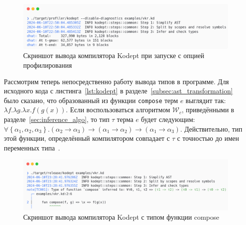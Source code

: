 \begin{figure}[h]
    \centering
    \includegraphics[width=\textwidth]{figures/profiling}
    \caption{Скриншот вывода компилятора Kodept при запуске с опцией профилирования}
    \label{fig:profiling}
\end{figure}

Рассмотрим теперь непосредственно работу вывода типов в программе.
Для исходного кода с листинга~\ref{lst:kodept} в разделе~\ref{subsec:ast_transformation} было сказано, что образованный из функции \lstinline{compose} терм $e$ выглядит так: $\lambda f. \lambda g. \lambda x. f(g(x))$.
Если воспользоваться алгоритмом $\mathcal{W}_c$, приведёнными в разделе~\ref{sec:inference_algo}, то тип $\tau$ терма $e$ будет следующим: $\forall \left\{ \alpha_1, \alpha_2, \alpha_3 \right\}. (\alpha_2 \to \alpha_3) \to (\alpha_1 \to \alpha_2) \to (\alpha_1 \to \alpha_3)$.
Действительно, тип этой функции, определённый компилятором совпадает с $\tau$ с точностью до имен переменных типа~.

\begin{figure}
    \centering
    \includegraphics[width=\textwidth]{figures/inferring}
    \caption{Скриншот вывода компилятора Kodept с типом функции compose}
    \label{fig:inferring}
\end{figure}


